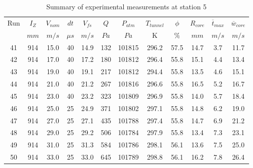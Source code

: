\begin{table}[H]
\begin{center}
\begin{tabular}{|cccccccccccc|}
	\hline
	Run & $I_Z$ & $V_{nom}$ & $dt$ & $V_{fs}$ & $Q$ & $P_{atm}$ & $T_{tunnel}$ & $\phi$ & $R_{core}$ & $\overline{t}_{max}$ & $\overline{w}_{core}$\\
	  & $mm$ & $m/s$ & $\mu s$ & $m/s$ & $Pa$ & $Pa$ & K & $\%$ & $mm$ & $m/s$ & $m/s$\\
	\hline
	41 & 914 & 15.0 & 40 & 14.9 & 132 & 101815 & 296.2 & 57.5 & 14.7 & 3.7 & 11.7\\
	42 & 914 & 17.0 & 40 & 17.2 & 180 & 101812 & 296.4 & 55.8 & 15.1 & 4.4 & 13.4\\
	43 & 914 & 19.0 & 40 & 19.1 & 217 & 101812 & 294.4 & 55.8 & 13.5 & 4.6 & 15.1\\
	44 & 914 & 21.0 & 40 & 21.2 & 267 & 101816 & 296.6 & 55.8 & 16.5 & 5.2 & 16.7\\
	45 & 914 & 23.0 & 40 & 23.2 & 323 & 101809 & 296.9 & 55.8 & 14.0 & 5.7 & 18.4\\
	46 & 914 & 25.0 & 25 & 24.9 & 371 & 101802 & 297.1 & 55.8 & 14.8 & 6.2 & 19.0\\
	47 & 914 & 27.0 & 25 & 27.1 & 435 & 101788 & 297.4 & 55.8 & 14.7 & 6.9 & 21.2\\
	48 & 914 & 29.0 & 25 & 29.2 & 506 & 101784 & 297.9 & 55.8 & 13.4 & 7.3 & 23.1\\
	49 & 914 & 31.0 & 25 & 31.3 & 584 & 101786 & 298.1 & 56.1 & 13.6 & 7.5 & 25.0\\
	50 & 914 & 33.0 & 25 & 33.0 & 645 & 101789 & 298.8 & 56.1 & 16.2 & 7.8 & 26.4\\
	\hline
\end{tabular}
\caption{Summary of experimental measurements at station 5}
\label{table:experiment_results_5}
\end{center}
\end{table}
